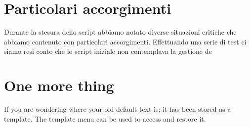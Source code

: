 \documentclass[a4paper]{article}
\begin{document}
\section{Particolari accorgimenti}

Durante la stesura dello script abbiamo notato diverse situazioni critiche che abbiamo contenuto con particolari accorgimenti. Effettuando una serie di test ci siamo resi conto che lo script iniziale non contemplava la gestione de

\section{One more thing}
If you are wondering where your old default text is; it has been stored as a template. The template menu can be used to access and restore it.
\end{document}
